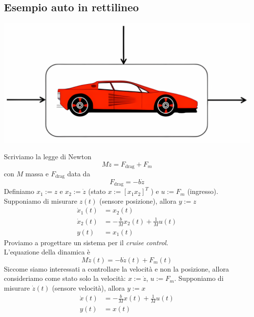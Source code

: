 \documentclass{article}
\numberwithin{equation}{subsection}
\let\oldsubsection\subsection%
\renewcommand{\subsection}{%
  \renewcommand{\theequation}{\thesubsection.\arabic{equation}}%
  \oldsubsection}%
\begin{document}
\subsection{Esempio auto in rettilineo}
\begin{center}
    \includegraphics[scale=0.18]{Images/Es_Rettilineo.png}
\end{center}
Scriviamo la legge di Newton
\begin{equation}
    M \ddot z = F_{\text{drag}} + F_m
\end{equation}
con $M$ massa e $F_{\text{drag}}$ data da
\begin{equation}
    F_{\text{drag}} = -b \dot z
\end{equation}
Definiamo $x_1 := z$ e $x_2 := \dot z$ (stato $x := [x_1 x_2 ]^T$ ) e $u := F_m$ (ingresso). Supponiamo di misurare $z(t)$ (sensore posizione), allora $y := z$
\begin{align*}
    \dot x_1(t) &= x_2(t)\\
    \dot x_2(t) &= - \frac{b}{M} x_2(t) + \frac{1}{M}u(t)\\
    y(t) &= x_1(t)
\end{align*}
Proviamo a progettare un sistema per il \textit{cruise control}.\\
L'equazione della dinamica è
\begin{equation}
    M \ddot z(t) = -b\dot z(t) + F_m (t)
\end{equation}
Siccome siamo interessati a controllare la velocità e non la posizione, allora consideriamo come stato solo la velocità: $x := \dot z$, $u := F_m$. Supponiamo di misurare $\dot z(t)$ (sensore velocità), allora $y := x$
\begin{align*}
    \dot x(t) &= - \frac{b}{M}x(t) + \frac{1}{M}u(t)\\
    y(t) &= x(t)
\end{align*}
\end{document}
